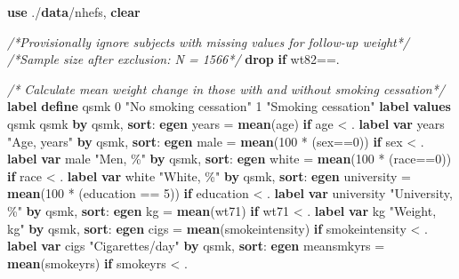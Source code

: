 \documentclass[
  10pt,
]{book}
\newenvironment{Shaded}{\begin{snugshade}}{\end{snugshade}}
\newcommand{\BaseNTok}[1]{\textcolor[rgb]{0.00,0.00,0.81}{#1}}
\newcommand{\CommentTok}[1]{\textcolor[rgb]{0.56,0.35,0.01}{\textit{#1}}}
\newcommand{\KeywordTok}[1]{\textcolor[rgb]{0.13,0.29,0.53}{\textbf{#1}}}
\newcommand{\NormalTok}[1]{#1}
\newcommand{\StringTok}[1]{\textcolor[rgb]{0.31,0.60,0.02}{#1}}
\begin{document}
\begin{Shaded}
\begin{Highlighting}[]
\KeywordTok{use}\NormalTok{ ./}\KeywordTok{data}\NormalTok{/nhefs, }\KeywordTok{clear}

\CommentTok{/*Provisionally ignore subjects with missing values for follow{-}up weight*/}
\CommentTok{/*Sample size after exclusion: N = 1566*/}
\KeywordTok{drop} \KeywordTok{if}\NormalTok{ wt82==.}

\CommentTok{/* Calculate mean weight change in those with and without smoking cessation*/}
\KeywordTok{label} \KeywordTok{define}\NormalTok{ qsmk 0 }\StringTok{"No smoking cessation"}\NormalTok{ 1 }\StringTok{"Smoking cessation"}
\KeywordTok{label} \KeywordTok{values}\NormalTok{ qsmk qsmk}
\KeywordTok{by}\NormalTok{ qsmk, }\KeywordTok{sort}\NormalTok{: }\KeywordTok{egen}\NormalTok{ years = }\KeywordTok{mean}\NormalTok{(age) }\KeywordTok{if}\NormalTok{ age \textless{} . }
\KeywordTok{label} \KeywordTok{var}\NormalTok{ years }\StringTok{"Age, years"}
\KeywordTok{by}\NormalTok{ qsmk, }\KeywordTok{sort}\NormalTok{: }\KeywordTok{egen}\NormalTok{ male = }\KeywordTok{mean}\NormalTok{(100 * (sex==0)) }\KeywordTok{if}\NormalTok{ sex \textless{} . }
\KeywordTok{label} \KeywordTok{var}\NormalTok{ male }\StringTok{"Men, \%"}
\KeywordTok{by}\NormalTok{ qsmk, }\KeywordTok{sort}\NormalTok{: }\KeywordTok{egen} \BaseNTok{white}\NormalTok{ = }\KeywordTok{mean}\NormalTok{(100 * (race==0)) }\KeywordTok{if}\NormalTok{ race \textless{} . }
\KeywordTok{label} \KeywordTok{var} \BaseNTok{white} \StringTok{"White, \%"}
\KeywordTok{by}\NormalTok{ qsmk, }\KeywordTok{sort}\NormalTok{: }\KeywordTok{egen}\NormalTok{ university = }\KeywordTok{mean}\NormalTok{(100 * (education == 5)) }\KeywordTok{if}\NormalTok{ education \textless{} .}
\KeywordTok{label} \KeywordTok{var}\NormalTok{ university }\StringTok{"University, \%"}
\KeywordTok{by}\NormalTok{ qsmk, }\KeywordTok{sort}\NormalTok{: }\KeywordTok{egen}\NormalTok{ kg = }\KeywordTok{mean}\NormalTok{(wt71) }\KeywordTok{if}\NormalTok{ wt71 \textless{} .}
\KeywordTok{label} \KeywordTok{var}\NormalTok{ kg }\StringTok{"Weight, kg"}
\KeywordTok{by}\NormalTok{ qsmk, }\KeywordTok{sort}\NormalTok{: }\KeywordTok{egen}\NormalTok{ cigs = }\KeywordTok{mean}\NormalTok{(smokeintensity) }\KeywordTok{if}\NormalTok{ smokeintensity \textless{} . }
\KeywordTok{label} \KeywordTok{var}\NormalTok{ cigs }\StringTok{"Cigarettes/day"}
\KeywordTok{by}\NormalTok{ qsmk, }\KeywordTok{sort}\NormalTok{: }\KeywordTok{egen}\NormalTok{ meansmkyrs = }\KeywordTok{mean}\NormalTok{(smokeyrs) }\KeywordTok{if}\NormalTok{ smokeyrs \textless{} .}

\end{Highlighting}
\end{Shaded}
\end{document}
